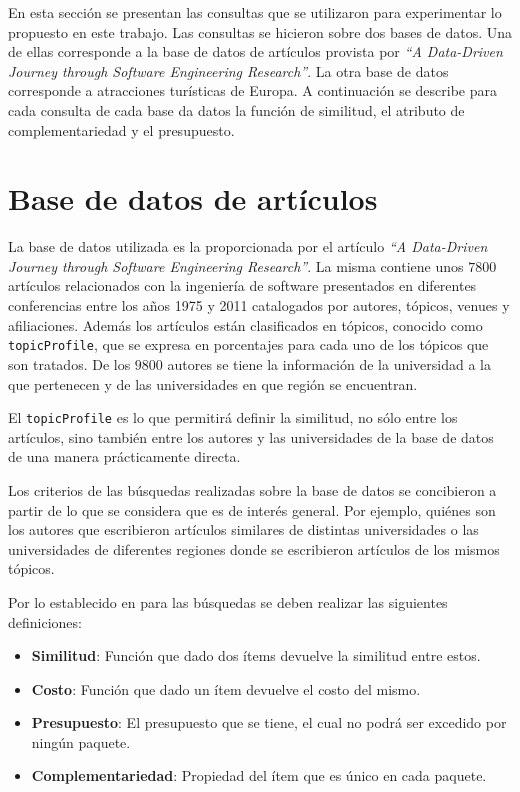 En esta sección se presentan las consultas que se utilizaron para experimentar lo propuesto en este trabajo. Las consultas se hicieron sobre dos bases de datos. Una de ellas corresponde a la base de datos de artículos provista por \textit{\textquotedblleft A Data-Driven Journey through Software Engineering Research\textquotedblright}\cite{dataDrive}. La otra base de datos corresponde a atracciones turísticas de Europa. A continuación se describe para cada consulta de cada base da datos la función de similitud, el atributo de complementariedad y el presupuesto. 

\section{Base de datos de artículos}
La base de datos utilizada es la proporcionada por el artículo \textit{\textquotedblleft A Data-Driven Journey through Software Engineering Research\textquotedblright}\cite{dataDrive}. La misma contiene unos $7800$ artículos relacionados con la ingeniería de software presentados en diferentes conferencias entre los años 1975 y 2011 catalogados por autores, tópicos, venues y afiliaciones. Además los artículos están clasificados en tópicos, conocido como \texttt{topicProfile}, que se expresa en porcentajes para cada uno de los tópicos que son tratados. De los $9800$ autores se tiene la información de la universidad a la que pertenecen y de las universidades en que región se encuentran.

El \texttt{topicProfile} es lo que permitirá definir la similitud, no sólo entre los artículos, sino también entre los autores y las universidades de la base de datos de una manera prácticamente directa.

Los criterios de las búsquedas realizadas sobre la base de datos se concibieron a partir de lo que se considera que es de interés general. Por ejemplo, quiénes son los autores que escribieron artículos similares de distintas universidades o las universidades de diferentes regiones donde se escribieron artículos de los mismos tópicos.

Por lo establecido en \cite{compositeRetrival} para las búsquedas se deben realizar las siguientes definiciones:
\begin{itemize}
  \item \textbf{Similitud}: Función que dado dos ítems devuelve la similitud entre estos.
  \item \textbf{Costo}: Función que dado un ítem devuelve el costo del mismo.
  \item \textbf{Presupuesto}: El presupuesto que se tiene, el cual no podrá ser excedido por ningún paquete.
  \item \textbf{Complementariedad}: Propiedad del ítem que es único en cada paquete.
\end{itemize}


